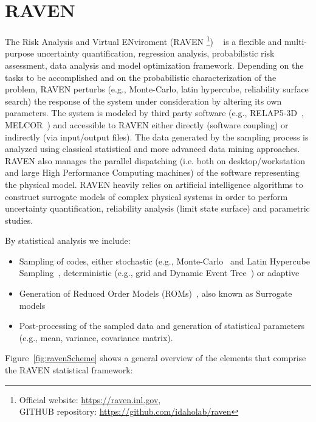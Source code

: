 \section{RAVEN}
\label{sec:raven}
 
The Risk Analysis and Virtual ENviroment 
(RAVEN
\footnote{Official website: \url{https://raven.inl.gov},\\ 
GITHUB repository: \url{https://github.com/idaholab/raven}})
~\cite{RAVEN_PSAM_2014,alfonsiEsrel2014} 
is a flexible and multi-purpose uncertainty quantification, regression analysis, probabilistic
risk assessment, data analysis and model optimization framework. Depending on the tasks to be 
accomplished and on the probabilistic characterization of the problem, RAVEN perturbs 
(e.g., Monte-Carlo, latin hypercube, reliability surface search) the response of the system 
under consideration by altering its own parameters. The system is modeled by third party software 
(e.g., RELAP5-3D~\cite{relap5}, MELCOR~\cite{Melcor}) and accessible to RAVEN either directly (software coupling) 
or indirectly (via input/output files). The data generated by the sampling process is analyzed using 
classical statistical and more advanced data mining approaches. RAVEN also manages the parallel dispatching 
(i.e. both on desktop/workstation and large High Performance Computing machines) of the software 
representing the physical model. RAVEN heavily relies on artificial intelligence algorithms to construct 
surrogate models of complex physical systems in order to perform uncertainty quantification, reliability 
analysis (limit state surface) and parametric studies.

By statistical analysis we include:
\begin{itemize}
  \item Sampling of codes, either stochastic (e.g., Monte-Carlo~\cite{DynamicReliabilityMonteCarlo} 
        and Latin Hypercube Sampling~\cite{LHShelton}, deterministic (e.g., grid and
        Dynamic Event Tree~\cite{AMENDOLAdylam,cojazziDylam}) or adaptive~\cite{ANS_S_2014_raven_LS,mandelliSVMANS}
  \item Generation of Reduced Order Models (ROMs)~\cite{ROM_Khalik}, also known as Surrogate models
  \item Post-processing of the sampled data and generation of statistical parameters (e.g., mean, 
        variance, covariance matrix).
\end{itemize}

Figure~\ref{fig:ravenScheme} shows a general overview of the elements that comprise the RAVEN statistical framework:

